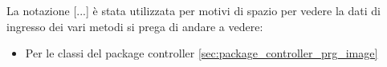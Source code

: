 La notazione [...] è stata utilizzata per motivi di spazio per vedere la dati di ingresso dei vari metodi si prega di andare a vedere:
\begin{itemize}
    \item Per le classi del package controller \ref{sec:package_controller_prg_image}
\end{itemize}

